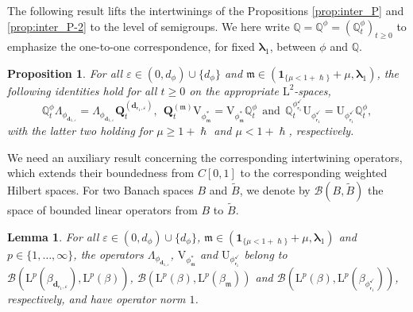 \documentclass[10pt]{amsart}
\let\epsilon\varepsilon
\theoremstyle{plain}
\newtheorem{lemma}[theorem]{Lemma}
\newtheorem{proposition}[theorem]{Proposition}
\theoremstyle{definition}
\newcommand{\J}{\mathds{Q}}
\newcommand{\Leb}{\mathrm{L}}
\newcommand{\m}{\mathfrak{m}}
\newcommand{\dpt}{\bm{d}_{\vat,\epsilon}}
\newcommand{\dz}{{\bm{d}}_{1,\epsilon}}
\newcommand{\Bop}[2]{\mathcal{B}(#1,#2)}
\newcommand{\lam}{{\bm{\lambda}_1}}
\newcommand{\vat}{{\mathsf{r}_1}}
\newcommand{\phm}{{\phi_\m^*}}
\renewcommand{\varphi}{{\phi_{\vat}^{\checkmark}}}
\newcommand{\Q}[1][\mo]{\mathbf{Q}^{({#1})}}
\newcommand{\gab}[1][\lam,\mo]{{\beta_{#1}}}
\let\h\hslash
\let\mo\mu
\let\bpsi\beta
\begin{document}
The following result lifts the intertwinings of the Propositions \ref{prop:inter_P} and \ref{prop:inter_P-2} to the level of semigroups. We here write $\J=\J^\phi = (\J_t^\phi)_{t \geq 0}$ to emphasize the one-to-one correspondence, for fixed $\lam$, between $\phi$ and $\J$.

\begin{proposition}
\label{prop:intertwining}
For all $\epsilon \in (0,d_\phi) \cup \{d_\phi\}$ and $\m \in (\bm{1}_{\{\mo < 1+\h\}}+\mo,\lam)$,
the following identities hold for all $t \geq 0$ on the appropriate $\Leb^2$-spaces,
\begin{equation}
\label{eq:inter-right-d0}
\J_t^\phi \Lambda_{\phi_{\dz}} = \Lambda_{\phi_{\dz}} \Q[\dpt]_t, \ \ \Q[\m]_t \mathrm{V}_{\phm} = \mathrm{V}_{\phm} \J_t^\phi \ \ \text{and} \ \ \J_t^\varphi {\mathrm{U}}_\varphi = {\mathrm{U}}_\varphi \J_t^\phi,
\end{equation}
with the latter two holding for $\mo \geq 1+\h$ and $\mo < 1+\h$, respectively.
\end{proposition}

We need an auxiliary result concerning the corresponding intertwining operators, which extends their boundedness from $C[0,1]$ to the corresponding weighted Hilbert spaces. For two Banach spaces $B$ and $\widetilde{B}$, we denote by $\Bop{B}{\widetilde{B}}$ the space of bounded linear operators from $B$ to $\widetilde{B}$.

\begin{lemma}
\label{lem:Lambda-L2-bounded}
For all $\epsilon \in (0,d_\phi) \cup \{d_\phi\}$, $\m \in (\bm{1}_{\{\mo < 1+\h\}} + \mo, \lam)$ and
$p \in \{1,\ldots,\infty\}$, the operators $\Lambda_{\phi_{\dz}}$, $\mathrm{V}_{\phm}$ and $\mathrm{U}_\varphi$ belong to $\Bop{\Leb^p(\gab[\dpt])}{\Leb^p(\bpsi)}$, $\Bop{\Leb^p(\bpsi)}{\Leb^p(\gab[\m])}$ and $\Bop{\Leb^p(\bpsi)}{\Leb^p(\bpsi_\varphi)}$, respectively, and have operator norm $1$.
\end{lemma}
\end{document}
